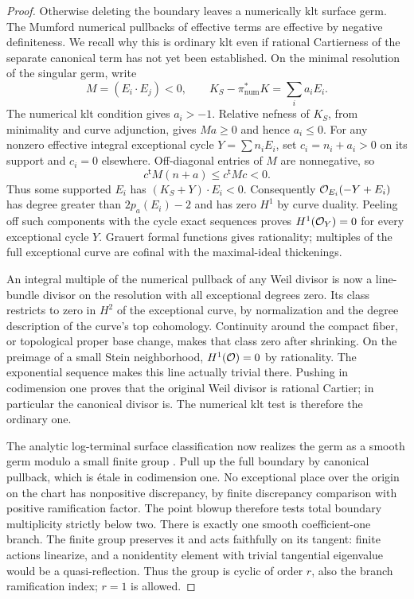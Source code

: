 \begin{proof}
Otherwise deleting the boundary leaves a numerically klt surface
germ.  The Mumford numerical pullbacks of effective terms are
effective by negative definiteness.  We recall why this is ordinary
klt even if rational Cartierness of the separate canonical term has
not yet been established.  On the minimal resolution of the
singular germ, write
\[
 M=(E_i\cdot E_j)<0,\qquad
 K_S-\pi^*_{\mathrm{num}}K=\sum_i a_iE_i.
\]
The numerical klt condition gives $a_i>-1$.  Relative nefness of
$K_S$, from minimality and curve adjunction, gives $Ma\geq0$ and
hence $a_i\leq0$.  For any nonzero effective integral exceptional
cycle $Y=\sum n_iE_i$, set $c_i=n_i+a_i>0$ on its support and
$c_i=0$ elsewhere.  Off-diagonal entries of $M$ are nonnegative, so
\begin{equation}
 c^{\mathsf t}M(n+a)\leq c^{\mathsf t}Mc<0.
 \label{bir:numerical-surface}
\end{equation}
Thus some supported $E_i$ has $(K_S+Y)\cdot E_i<0$.
Consequently $\mathcal{O}_{E_i}(-Y+E_i)$ has degree greater than
$2p_a(E_i)-2$ and has zero $H^1$ by curve duality.  Peeling off such
components with the cycle exact sequences proves
$H^1(\mathcal{O}_Y)=0$ for every exceptional cycle $Y$.  Grauert formal
functions gives rationality; multiples of the full exceptional
curve are cofinal with the maximal-ideal thickenings.

An integral multiple of the numerical pullback of any Weil divisor
is now a line-bundle divisor on the resolution with all exceptional
degrees zero.  Its class restricts to zero in $H^2$ of the
exceptional curve, by normalization and the degree description of
the curve's top cohomology.  Continuity around the compact fiber,
or topological proper base change, makes that class zero after
shrinking.  On the preimage of a small Stein neighborhood,
$H^1(\mathcal{O})=0$ by rationality.  The exponential sequence makes this
line actually trivial there.  Pushing in codimension one proves
that the original Weil divisor is rational Cartier; in particular
the canonical divisor is.  The numerical klt test is therefore the
ordinary one.

The analytic log-terminal surface classification now realizes the
germ as a smooth germ modulo a small finite group
\cite[Chapter~4]{BirationalGeometry}.  Pull up the full boundary by
canonical pullback, which is \mbox{\'etale} in codimension one.  No
exceptional place over the origin on the chart has nonpositive
discrepancy, by finite discrepancy comparison with positive
ramification factor.  The point blowup therefore tests total
boundary multiplicity strictly below two.  There is exactly one
smooth coefficient-one branch.  The finite group preserves it and
acts faithfully on its tangent: finite actions linearize, and a
nonidentity element with trivial tangential eigenvalue would be a
quasi-reflection.  Thus the group is cyclic of order $r$, also the
branch ramification index; $r=1$ is allowed.


\end{proof}
